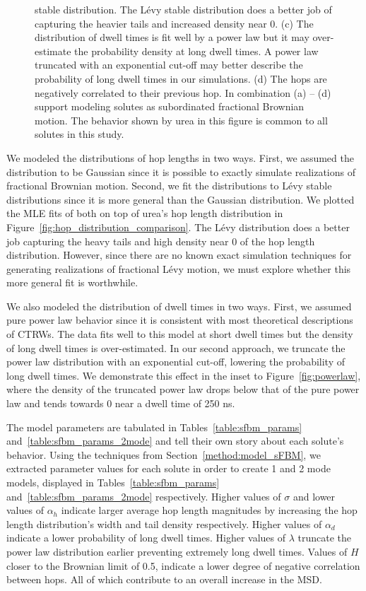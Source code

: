 \documentclass{article}
\begin{document}
\begin{figure}
{  stable distribution. The L\'evy stable distribution does a better job of capturing the 
  heavier tails and increased density near 0. (c) The distribution of dwell times is fit
  well by a power law but it may over-estimate the probability density at long dwell times.
  A power law truncated with an exponential cut-off may better describe the probability of
  long dwell times in our simulations. (d) The hops are negatively correlated to their previous
  hop. In combination (a) -- (d) support modeling solutes as subordinated fractional Brownian
  motion. The behavior shown by urea in this figure is common to all solutes in this study.}\label{fig:anticorrelated_hops}
  \end{figure}
  
  We modeled the distributions of hop lengths in two ways. First, we assumed the 
  distribution to be Gaussian since it is possible to exactly simulate realizations of
  fractional Brownian motion. Second, we fit the distributions to L\'evy stable 
  distributions since it is more general than the Gaussian distribution. We plotted
  the MLE fits of both on top of urea's hop length distribution in 
  Figure~\ref{fig:hop_distribution_comparison}. The L\'evy distribution does a better
  job capturing the heavy tails and high density near 0 of the hop length distribution.
  However, since there are no known exact simulation techniques for generating 
  realizations of fractional L\'evy motion, we must explore whether this more general
  fit is worthwhile. 
  
  We also modeled the distribution of dwell times in two ways. First, we assumed pure
  power law behavior since it is consistent with most theoretical descriptions of CTRWs.
  The data fits well to this model at short dwell times but
  the density of long dwell times is over-estimated. In our second approach, we truncate
  the power law distribution with an exponential cut-off, lowering the probability of
  long dwell times. We demonstrate this effect in the inset to Figure~\ref{fig:powerlaw}, where the
  density of the truncated power law drops below that of the pure power law and tends towards
  0 near a dwell time of 250 ns.
  
  The model parameters are tabulated in Tables~\ref{table:sfbm_params} 
  and~\ref{table:sfbm_params_2mode} and tell their own story about each solute's behavior. Using the 
  techniques from Section~\ref{method:model_sFBM}, we extracted parameter values for each
  solute in order to create 1 and 2 mode models, displayed in Tables~\ref{table:sfbm_params} 
  and~\ref{table:sfbm_params_2mode} respectively. Higher values of $\sigma$ and lower
  values of $\alpha_h$ indicate larger average hop length magnitudes by increasing the
  hop length distribution's width and tail density respectively. Higher values of $\alpha_d$
  indicate a lower probability of long dwell times. Higher values of $\lambda$ truncate
  the power law distribution earlier preventing extremely long dwell times. Values of $H$
  closer to the Brownian limit of 0.5, indicate a lower degree of negative correlation 
  between hops. All of which contribute to an overall increase in the MSD.
  
\end{document}
